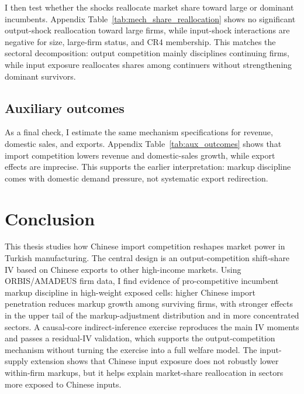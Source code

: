 ﻿\documentclass[12pt]{article}
\begin{document}
I then test whether the shocks reallocate market share toward large or dominant incumbents. Appendix Table~\ref{tab:mech_share_reallocation} shows no significant output-shock reallocation toward large firms, while input-shock interactions are negative for size, large-firm status, and CR4 membership. This matches the sectoral decomposition: output competition mainly disciplines continuing firms, while input exposure reallocates shares among continuers without strengthening dominant survivors.

\subsection{Auxiliary outcomes}

As a final check, I estimate the same mechanism specifications for revenue, domestic sales, and exports. Appendix Table~\ref{tab:aux_outcomes} shows that import competition lowers revenue and domestic-sales growth, while export effects are imprecise. This supports the earlier interpretation: markup discipline comes with domestic demand pressure, not systematic export redirection.

\section{Conclusion}

This thesis studies how Chinese import competition reshapes market power in Turkish manufacturing. The central design is an output-competition shift-share IV based on Chinese exports to other high-income markets. Using ORBIS/AMADEUS firm data, I find evidence of pro-competitive incumbent markup discipline in high-weight exposed cells: higher Chinese import penetration reduces markup growth among surviving firms, with stronger effects in the upper tail of the markup-adjustment distribution and in more concentrated sectors. A causal-core indirect-inference exercise reproduces the main IV moments and passes a residual-IV validation, which supports the output-competition mechanism without turning the exercise into a full welfare model. The input-supply extension shows that Chinese input exposure does not robustly lower within-firm markups, but it helps explain market-share reallocation in sectors more exposed to Chinese inputs.
\end{document}
